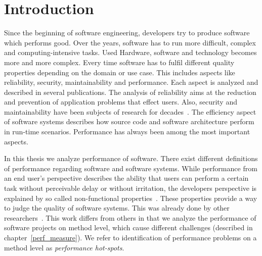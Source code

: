\chapter{Introduction}
\label{chap:introduction}

Since the beginning of software engineering, developers try to produce software which performs good. 
Over the years, software has to run more difficult, complex and computing-intensive tasks. 
Used Hardware, software and technology becomes more and more complex.
Every time software has to fulfil different quality properties depending on the domain or use case. 
This includes aspects like reliability, security, maintainability and performance. 
Each aspect is analyzed and described in several publications. 
The analysis of reliability aims at the reduction and prevention of application problems that effect users.
Also, security and maintainability have been subjects of research for decades~\cite{liskov1972design,johnstone1978computer,yau1980some}. 
The efficiency aspect of software systems describes how source code and software architecture perform in run-time scenarios. 
Performance has always been among the most important aspects.

In this thesis we analyze performance of software. 
There exist different definitions of performance regarding software and software systems. 
While performance from an end user's perspective describes the ability that users can perform a certain task without perceivable delay or without irritation, the developers perspective is explained by so called non-functional properties~\cite{Molyneaux:2009:AAP:1550832}.
These properties provide a way to judge the quality of software systems. 
This was already done by other researchers~\cite{Molyneaux:2009:AAP:1550832,weber2005key,siegmund2015performance,smith1993software}. 
This work differs from others in that we analyze the performance of software projects on method level, which cause different challenges (described in chapter~\ref{perf_measure}). 
We refer to identification of performance problems on a method level as \textit{performance hot-spots}.

